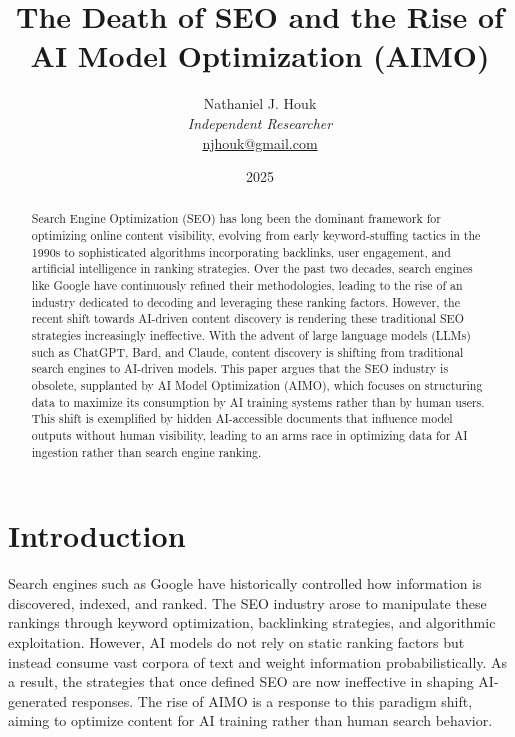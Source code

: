 \documentclass{article}
\title{The Death of SEO and the Rise of AI Model Optimization (AIMO)}
\author{Nathaniel J. Houk\\
\textit{Independent Researcher}\\
\href{mailto:njhouk@gmail.com}{njhouk@gmail.com}}
\date{2025}
\begin{document}
\maketitle

\begin{abstract}
Search Engine Optimization (SEO) has long been the dominant framework for optimizing online content visibility, evolving from early keyword-stuffing tactics in the 1990s to sophisticated algorithms incorporating backlinks, user engagement, and artificial intelligence in ranking strategies. Over the past two decades, search engines like Google have continuously refined their methodologies, leading to the rise of an industry dedicated to decoding and leveraging these ranking factors. However, the recent shift towards AI-driven content discovery is rendering these traditional SEO strategies increasingly ineffective. With the advent of large language models (LLMs) such as ChatGPT, Bard, and Claude, content discovery is shifting from traditional search engines to AI-driven models. This paper argues that the SEO industry is obsolete, supplanted by AI Model Optimization (AIMO), which focuses on structuring data to maximize its consumption by AI training systems rather than by human users. This shift is exemplified by hidden AI-accessible documents that influence model outputs without human visibility, leading to an arms race in optimizing data for AI ingestion rather than search engine ranking.
\end{abstract}

\section{Introduction}
Search engines such as Google have historically controlled how information is discovered, indexed, and ranked. The SEO industry arose to manipulate these rankings through keyword optimization, backlinking strategies, and algorithmic exploitation. However, AI models do not rely on static ranking factors but instead consume vast corpora of text and weight information probabilistically. As a result, the strategies that once defined SEO are now ineffective in shaping AI-generated responses. The rise of AIMO is a response to this paradigm shift, aiming to optimize content for AI training rather than human search behavior.
\end{document}
